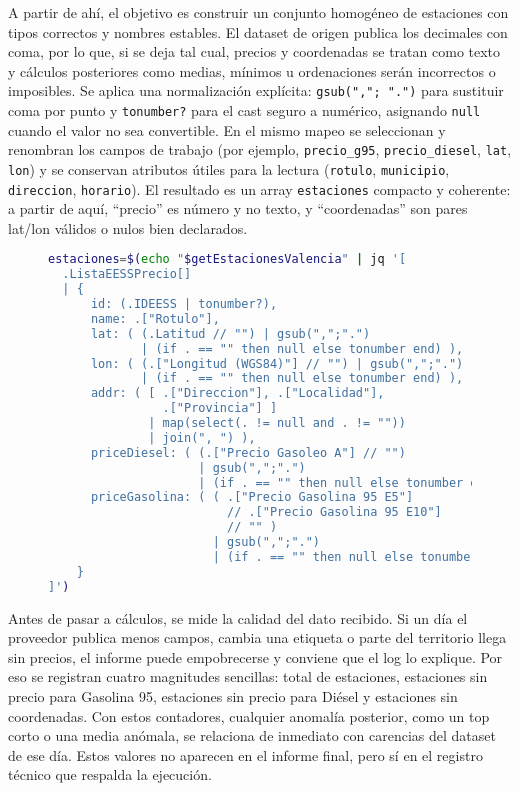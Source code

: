 A partir de ahí, el objetivo es construir un conjunto homogéneo de estaciones con tipos correctos y nombres estables. El dataset de origen publica los decimales con coma, por lo que, si se deja tal cual, precios y coordenadas se tratan como texto y cálculos posteriores como medias, mínimos u ordenaciones serán incorrectos o imposibles. Se aplica una normalización explícita: \texttt{gsub(","; ".")} para sustituir coma por punto y \texttt{tonumber?} para el cast seguro a numérico, asignando \texttt{null} cuando el valor no sea convertible. En el mismo mapeo se seleccionan y renombran los campos de trabajo (por ejemplo, \texttt{precio\_g95}, \texttt{precio\_diesel}, \texttt{lat}, \texttt{lon}) y se conservan atributos útiles para la lectura (\texttt{rotulo}, \texttt{municipio}, \texttt{direccion}, \texttt{horario}). El resultado es un array \texttt{estaciones} compacto y coherente: a partir de aquí, ``precio'' es número y no texto, y ``coordenadas'' son pares lat/lon válidos o nulos bien declarados.

\begin{figure}[H]
  \begin{lstlisting}[language=bash, caption={Figura 4.2 — Normalización y tipado con jq}]
estaciones=$(echo "$getEstacionesValencia" | jq '[
  .ListaEESSPrecio[]
  | {
      id: (.IDEESS | tonumber?),
      name: .["Rotulo"],
      lat: ( (.Latitud // "") | gsub(",";".") 
             | (if . == "" then null else tonumber end) ),
      lon: ( (.["Longitud (WGS84)"] // "") | gsub(",";".") 
             | (if . == "" then null else tonumber end) ),
      addr: ( [ .["Direccion"], .["Localidad"], 
                .["Provincia"] ] 
              | map(select(. != null and . != "")) 
              | join(", ") ),
      priceDiesel: ( (.["Precio Gasoleo A"] // "") 
                     | gsub(",";".") 
                     | (if . == "" then null else tonumber end) ),
      priceGasolina: ( ( .["Precio Gasolina 95 E5"]
                         // .["Precio Gasolina 95 E10"]
                         // "" )
                       | gsub(",";".") 
                       | (if . == "" then null else tonumber end) )
    }
]')
\end{lstlisting}
\end{figure}

Antes de pasar a cálculos, se mide la calidad del dato recibido. Si un día el proveedor publica menos campos, cambia una etiqueta o parte del territorio llega sin precios, el informe puede empobrecerse y conviene que el log lo explique. Por eso se registran cuatro magnitudes sencillas: total de estaciones, estaciones sin precio para Gasolina 95, estaciones sin precio para Diésel y estaciones sin coordenadas. Con estos contadores, cualquier anomalía posterior, como un top corto o una media anómala, se relaciona de inmediato con carencias del dataset de ese día. Estos valores no aparecen en el informe final, pero sí en el registro técnico que respalda la ejecución.

